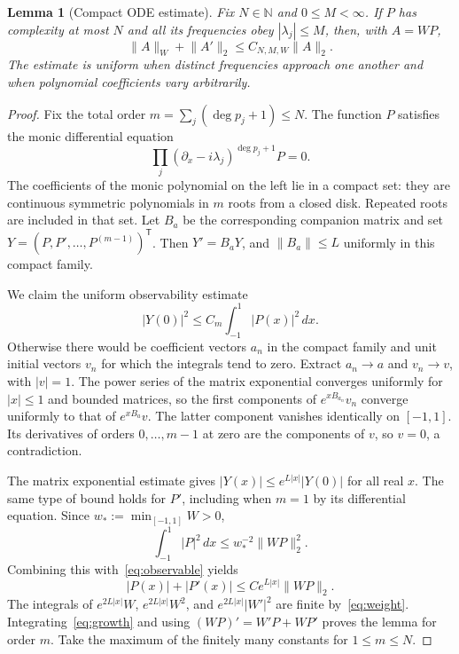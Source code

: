 \documentclass[11pt]{article}
\newtheorem{lemma}[theorem]{Lemma}
\theoremstyle{definition}
\theoremstyle{remark}
\newcommand{\N}{\mathbb N}
\newcommand{\norm}[1]{\lVert #1\rVert}
\newcommand{\dd}{\,dx}
\begin{document}
\begin{lemma}[Compact ODE estimate]\label{lem:ode}
Fix $N\in\N$ and $0\le M<\infty$. If $P$ has complexity at most $N$ and all
its frequencies obey $|\lambda_j|\le M$, then, with $A=WP$,
\begin{equation}\label{eq:envelope}
 \norm A_W+\norm{A'}_2\le C_{N,M,W}\norm A_2.
\end{equation}
The estimate is uniform when distinct frequencies approach one another
and when polynomial coefficients vary arbitrarily.
\end{lemma}
\begin{proof}
Fix the total order $m=\sum_j(\deg p_j+1)\le N$. The function $P$
satisfies the monic differential equation
\begin{equation}\label{eq:annihilator}
 \prod_j(\partial_x-i\lambda_j)^{\deg p_j+1}P=0.
\end{equation}
The coefficients of the monic polynomial on the left lie in a compact set:
they are continuous symmetric polynomials in $m$ roots from a closed disk.
Repeated roots are included in that set. Let $B_a$ be the corresponding
companion matrix and set $Y=(P,P',\ldots,P^{(m-1)})^{\mathsf T}$. Then
$Y'=B_aY$, and $\norm{B_a}\le L$ uniformly in this compact family.

We claim the uniform observability estimate
\begin{equation}\label{eq:observable}
 |Y(0)|^2\le C_m\int_{-1}^1|P(x)|^2\dd.
\end{equation}
Otherwise there would be coefficient vectors $a_n$ in the compact family
and unit initial vectors $v_n$ for which the integrals tend to zero.
Extract $a_n\to a$ and $v_n\to v$, with $|v|=1$. The power series of the
matrix exponential converges uniformly for $|x|\le1$ and bounded matrices,
so the first components of $e^{xB_{a_n}}v_n$ converge uniformly to that of
$e^{xB_a}v$. The latter component vanishes identically on $[-1,1]$.
Its derivatives of orders $0,\ldots,m-1$ at zero are the components of $v$,
so $v=0$, a contradiction.

The matrix exponential estimate gives
$|Y(x)|\le e^{L|x|}|Y(0)|$ for all real $x$. The same type of bound holds
for $P'$, including when $m=1$ by its differential equation. Since
$w_*:=\min_{[-1,1]}W>0$,
\[
 \int_{-1}^1|P|^2\dd\le w_*^{-2}\norm{WP}_2^2.
\]
Combining this with~\eqref{eq:observable} yields
\begin{equation}\label{eq:growth}
 |P(x)|+|P'(x)|\le C e^{L|x|}\norm{WP}_2.
\end{equation}
The integrals of $e^{2L|x|}W$, $e^{2L|x|}W^2$, and
$e^{2L|x|}|W'|^2$ are finite by~\eqref{eq:weight}.
Integrating~\eqref{eq:growth} and using $(WP)'=W'P+WP'$ proves the lemma
for order $m$. Take the maximum of the finitely many constants for
$1\le m\le N$.
\end{proof}
\end{document}
